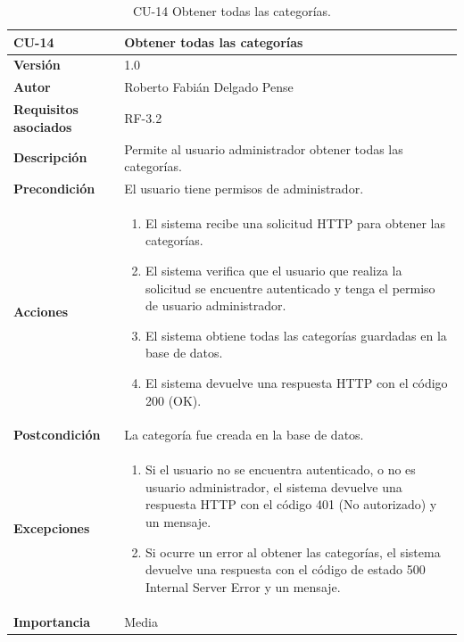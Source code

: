 \begin{table}[p]
	\centering
	\begin{tabularx}{\linewidth}{ p{} p{} }
		\toprule
		\textbf{CU-14}    & \textbf{Obtener todas las categorías}\\
		\toprule
		\textbf{Versión}              & 1.0    \\
		\textbf{Autor}                & Roberto Fabián Delgado Pense \\
		\textbf{Requisitos asociados} & RF-3.2 \\ 
		\textbf{Descripción}          & Permite al usuario administrador obtener todas las categorías. \\
		\textbf{Precondición}         & El usuario tiene permisos de administrador. \\
		\textbf{Acciones}             &
		\begin{enumerate}
			\def\labelenumi{\arabic{enumi}.}
			\tightlist
			\item El sistema recibe una solicitud HTTP para obtener las categorías.
                \item El sistema verifica que el usuario que realiza la solicitud se encuentre autenticado y tenga el permiso de usuario administrador.
			\item El sistema obtiene todas las categorías guardadas en la base de datos.
                \item El sistema devuelve una respuesta HTTP con el código 200 (OK).
            \end{enumerate}\\
		\textbf{Postcondición}        & La categoría fue creada en la base de datos.\\
		\textbf{Excepciones}          & 
            \begin{enumerate}
			\def\labelenumi{\arabic{enumi}.}
			\tightlist
   			\item Si el usuario no se encuentra autenticado, o no es usuario administrador, el sistema devuelve una                 respuesta HTTP con el código 401 (No autorizado) y un mensaje.
                \item Si ocurre un error al obtener las categorías, el sistema devuelve una respuesta con el código de estado 500 Internal Server Error y un mensaje.
            \end{enumerate}\\
		\textbf{Importancia}          & Media \\
		\bottomrule
	\end{tabularx}
	\caption{CU-14 Obtener todas las categorías.}
\end{table}

